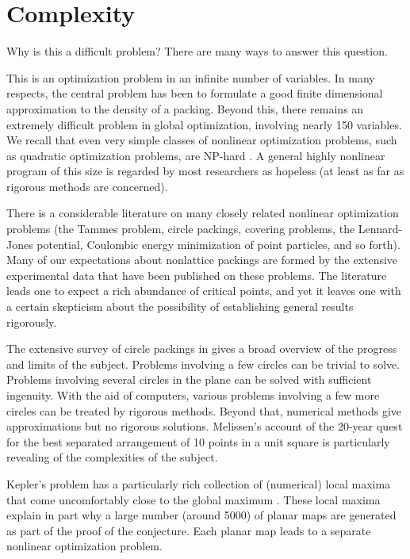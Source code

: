 \section{Complexity}

Why is this a difficult problem?  There are many ways to answer this
question.

This is an optimization problem in an infinite number of
variables.  In many respects, the central problem has been to
formulate a good finite dimensional approximation to the density
of a packing.  Beyond this, there remains an extremely difficult
problem in global optimization, involving nearly 150 variables.
We recall that even very simple classes of nonlinear optimization
problems, such as quadratic optimization problems, are NP-hard
\cite{HoPT95}.  A general highly nonlinear program of this size is
regarded by most researchers as hopeless (at least as far as
rigorous methods are concerned).

There is a considerable literature on many closely related nonlinear
optimization problems (the Tammes problem, circle packings, covering
problems, the Lennard-Jones potential, Coulombic energy minimization
of point particles, and so forth). Many of our expectations about
nonlattice packings are formed by the extensive experimental data
that have been published on these problems. The literature leads one
to expect a rich abundance of critical points, and yet it leaves one
with a certain skepticism about the possibility of establishing
general results rigorously.

The extensive survey of circle packings
in \cite{Mel97} gives a broad overview of the progress and limits
of the subject.
Problems involving a few circles can be
trivial to solve.
Problems involving several circles in the plane can be solved with
sufficient ingenuity.
With the aid of computers, various  problems involving
a few more circles can be
treated by rigorous methods.
Beyond that, numerical methods
give approximations but no rigorous solutions.
Melissen's account of
the 20-year quest for the best separated arrangement of 10
points in a unit square is particularly revealing of the complexities
of the subject.

Kepler's problem has a particularly rich collection of
(numerical) local maxima that come uncomfortably close to the
global maximum \cite{Hal92}.
These local maxima
explain in part why a large number (around 5000) of planar maps
are generated as part of the proof of the conjecture.  Each
planar map leads to a separate nonlinear optimization problem.



